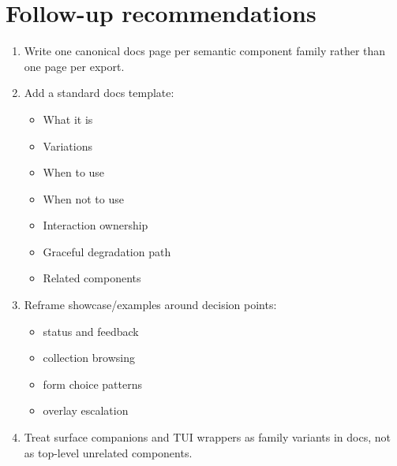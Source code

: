 \section{Follow-up recommendations}\label{record-425-follow-up-recommendations}

\begin{enumerate}
\def\labelenumi{\arabic{enumi}.}
\tightlist
\item
  Write one canonical docs page per semantic component family rather than one page per export.
\item
  Add a standard docs template:

  \begin{itemize}
  \tightlist
  \item
    What it is
  \item
    Variations
  \item
    When to use
  \item
    When not to use
  \item
    Interaction ownership
  \item
    Graceful degradation path
  \item
    Related components
  \end{itemize}
\item
  Reframe showcase/examples around decision points:

  \begin{itemize}
  \tightlist
  \item
    status and feedback
  \item
    collection browsing
  \item
    form choice patterns
  \item
    overlay escalation
  \end{itemize}
\item
  Treat surface companions and TUI wrappers as family variants in docs, not as top-level unrelated components.
\end{enumerate}

